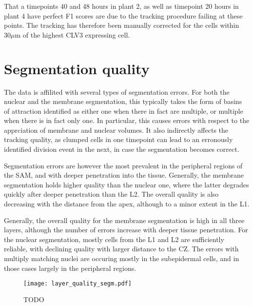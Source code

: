 That a timepoints 40 and 48 hours in plant 2, as well as timepoint 20 hours in
plant 4 have perfect F1 scores are due to the tracking procedure failing at
these points. The tracking has therefore been manually corrected for the cells
within $30\mu$m of the highest CLV3 expressing cell.

\section{Segmentation quality}
\label{sec:data_errors_segmentation}
The data is affilited with several types of segmentation errors. For both the
nuclear and the membrane segmentation, this typically takes the form of basins
of attraction identified as either one when there in fact are multiple, or
multiple when there is in fact only one. In particular, this causes errors with
respect to the apprciation of membrane and nuclear volumes. It also indirectly
affects the tracking quality, as clumped cells in one timepoint can lead to an
erronously identified division event in the next, in case the segmentation
becomes correct. 

Segmentation errors are however the most prevalent in the peripheral regions of
the SAM, and with deeper penetration into the tissue. Generally, the membrane
segmentation holds higher quality than the nuclear one, where the latter
degrades quickly after deeper penetration than the L2. The overall quality is
also decreasing with the distance from the apex, although to a minor extent in
the L1. 

Generally, the overall quality for the membrane segmentation is high in all
three layers, although the number of errors increase with deeper tissue
penetration. For the nuclear segmentation, mostly cells from the L1 and L2 are
sufficiently reliable, with declining quality with larger distance to the CZ.
The errors with multiply matching nuclei are occuring mostly in the subepidermal
cells, and in those cases largely in the peripheral regions.

\begin{figure}[H]
  \centering
  \texttt{[image: layer\_quality\_segm.pdf]}
  \caption[TODO]{TODO}
  \label{fig:layer_quality_segm}
\end{figure}








